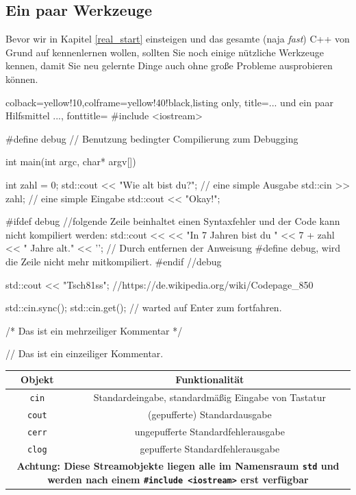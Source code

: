 \documentclass[a4paper]{report}
\begin{document}
\subsection{Ein paar Werkzeuge}
Bevor wir in Kapitel \ref{real_start} einsteigen und das gesamte (naja \textit{fast}) C++ von Grund auf kennenlernen wollen, sollten Sie noch einige nützliche Werkzeuge kennen, damit Sie neu gelernte Dinge auch ohne große Probleme ausprobieren können.
\begin{tcblisting}{colback=yellow!10,colframe=yellow!40!black,listing only,
		title=... und ein paar Hilfsmittel ..., fonttitle=\bfseries}
#include <iostream>


#define debug // Benutzung bedingter Compilierung zum Debugging

int main(int argc, char* argv[]){
	
	int zahl = 0;
	std::cout << "Wie alt bist du?\n"; // eine simple Ausgabe
	std::cin >> zahl; // eine simple Eingabe
	std::cout << "Okay!\n\n";
	
#ifdef debug 
	//folgende Zeile beinhaltet einen Syntaxfehler und der Code kann nicht kompiliert werden:
	std::cout << << "In 7 Jahren bist du " << 7 + zahl << " Jahre alt." << '\n';
	// Durch entfernen der Anweisung #define debug, wird die Zeile nicht mehr mitkompiliert.
#endif //debug

	std::cout << "Tsch\x81ss\n";
	//https://de.wikipedia.org/wiki/Codepage_850
	
	std::cin.sync();
	std::cin.get(); // warted auf Enter zum fortfahren.
	
	/*
	Das ist
	ein mehrzeiliger
	Kommentar
	*/
	
	// Das ist ein einzeiliger Kommentar.
}
\end{tcblisting}
\begin{center}
\begin{tabular}{|c|c|}
	\hline
	\textbf{Objekt} & \textbf{Funktionalität} \\
	\hline \hline
	\texttt{cin}	& Standardeingabe, standardmäßig Eingabe von Tastatur \\
	\hline
	\texttt{cout}	& (gepufferte) Standardausgabe \\
	\texttt{cerr}	& ungepufferte Standardfehlerausgabe \\
	\texttt{clog}	& gepufferte Standardfehlerausgabe \\
	\hline
	\multicolumn{2}{|p{11cm}|}{\textbf{Achtung: Diese Streamobjekte liegen alle im Namensraum \texttt{std} und werden nach einem \texttt{\#include <iostream>} erst verfügbar}}\\
	\hline
\end{tabular}
\end{center}
\end{document}
